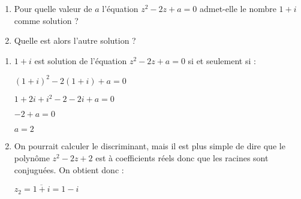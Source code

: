 
%
\begin{enumerate}
     \item
     Pour quelle valeur de $a$ l'équation $z^{2}-2z+a=0$ admet-elle le nombre $1+i$ comme solution ?
     \item
     Quelle est alors l'autre solution ?
\end{enumerate}
\begin{corrige}
     \begin{enumerate}
          \item
          $1+i$ est solution de l'équation $z^{2}-2z+a=0$ si et seulement si :
          \par
          $\left(1+i\right)^{2}-2\left(1+i\right)+a=0$
          \par
          $1+2i+i^{2}-2-2i+a=0$
          \par
          $-2+a=0$
          \par
          $a=2$
          \item
          On pourrait calculer le discriminant, mais il est plus simple de dire que le polynôme $z^{2}-2z+2$ est à coefficients réels donc que les racines sont conjuguées. On obtient donc :
          \par
          $z_{2}=\overline{1+i}=1-i$
     \end{enumerate}
\end{corrige}

